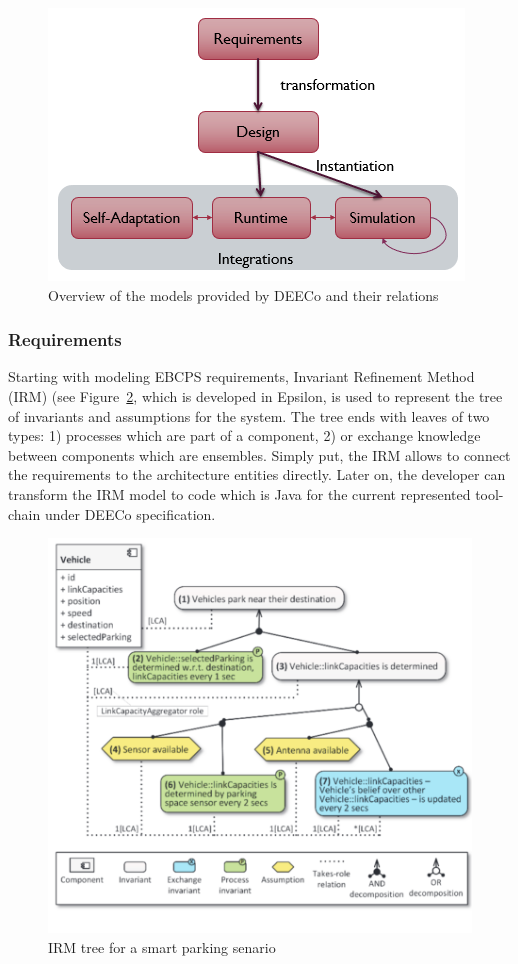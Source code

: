 \begin{figure}[!h]
\centering
\includegraphics[scale=0.80]{figures/deeco_map.PNG}
\caption{Overview of the models provided by DEECo and their relations}
\label{fig:deeco_map}
\end{figure}

\subsubsection{Requirements}
Starting with modeling EBCPS requirements, Invariant Refinement Method (IRM) \cite{Keznikl:2013:DEC:2465449.2465457} (see  Figure~\ref{fig:irm}, which is developed in Epsilon, is used to represent the tree of invariants and assumptions for the system. The tree ends with leaves of two types: 1) processes which are part of a component, 2) or exchange knowledge between components which are ensembles. Simply put, the IRM allows to connect the requirements to the architecture entities directly. Later on, the developer can transform the IRM model to code which is Java for the current represented tool-chain under DEECo specification.

\begin{figure}[!htb]
\centering
\includegraphics[scale=0.40]{figures/irm}
\caption{IRM tree for a smart parking senario}
\label{fig:irm}
\end{figure}


